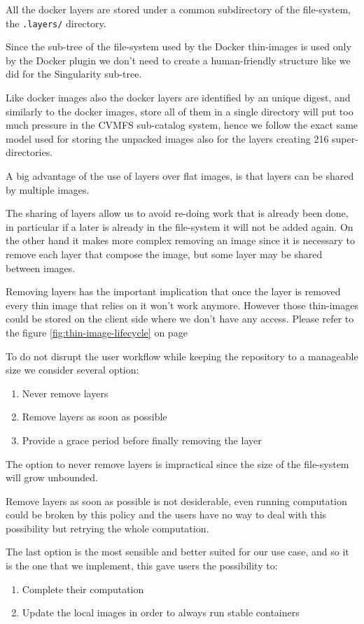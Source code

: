 All the docker layers are stored under a common subdirectory of the
file-system, the \texttt{.layers/} directory.

Since the sub-tree of the file-system used by the Docker thin-images is used only
by the Docker plugin we don't need to create a human-friendly structure like we
did for the Singularity sub-tree.

Like docker images also the docker layers are identified by an unique digest,
and similarly to the docker images, store all of them in a single directory
will put too much pressure in the CVMFS sub-catalog system, hence we follow the
exact same model used for storing the unpacked images also for the layers
creating 216 super-directories.

A big advantage of the use of layers over flat images, is that layers can be
shared by multiple images.

The sharing of layers allow us to avoid re-doing work that is already been
done, in particular if a later is already in the file-system it will not be
added again. On the other hand it makes more complex removing an image since it
is necessary to remove each layer that compose the image, but some layer may be
shared between images.

Removing layers has the important implication that once the layer is removed
every thin image that relies on it won’t work anymore.  However those
thin-images could be stored on the client side where we don’t have any access.
Please refer to the figure \ref{fig:thin-image-lifecycle} on page
\pageref{fig:thin-image-lifecycle}

To do not disrupt the user workflow while keeping the repository to a manageable
size we consider several option: 
\begin{enumerate}
\item Never remove layers
\item Remove layers as soon as possible
\item Provide a grace period before finally removing the layer
\end{enumerate}

The option to never remove layers is impractical since the size of the
file-system will grow unbounded.

Remove layers as soon as possible is not desiderable, even running computation
could be broken by this policy and the users have no way to deal with this
possibility but retrying the whole computation.

The last option is the most sensible and better suited for our use case, and so
it is the one that we implement, this gave users the possibility to:
\begin{enumerate}
\item Complete their computation
\item Update the local images in order to always run stable containers
\end{enumerate}

